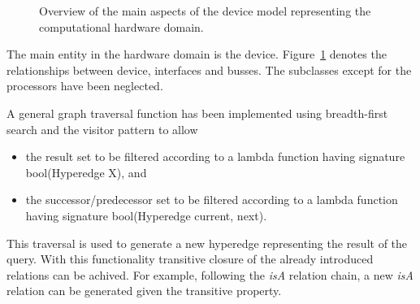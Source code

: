 \documentclass[a4paper,twocolumn]{esapub2005} %
\begin{document}
\begin{figure}
    \centering
    \caption{
        Overview of the main aspects of the device model representing the computational hardware domain.
    }
    \label{fig:hw_new}
\end{figure}
The main entity in the hardware domain is the device.
Figure~\ref{fig:hw_new} denotes the relationships between device, interfaces and busses.
The subclasses except for the processors have been neglected.

A general graph traversal function has been implemented using breadth-first search and the visitor pattern to allow
\begin{itemize}
    \item the result set to be filtered according to a lambda function having signature bool(Hyperedge X), and
    \item the successor/predecessor set to be filtered according to a lambda function having signature bool(Hyperedge current, next).
\end{itemize}
This traversal is used to generate a new hyperedge representing the result of the query.
With this functionality transitive closure of the already introduced relations can be achived.
For example, following the \emph{isA} relation chain, a new \emph{isA} relation can be generated given the transitive property.
\end{document}
